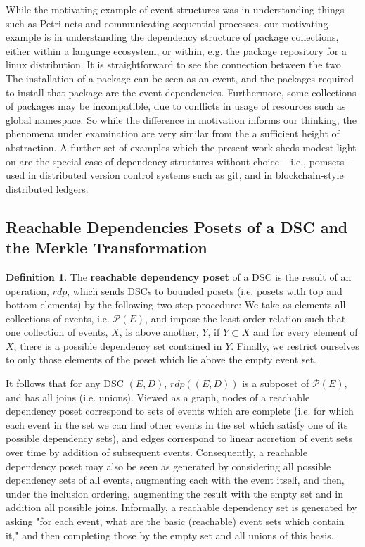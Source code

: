 \documentclass[hoptionsi,review,format=sigplan]{acmart}
\theoremstyle{definition}
\newtheorem{definition}{Definition}[section]
\newcommand{\Pc}{\mathcal{P}}
\begin{document}
While the motivating example of event structures was in understanding things such as Petri nets and communicating sequential processes, our motivating example is in understanding the dependency structure of package collections, either within a language ecosystem, or within, e.g. the package repository for a linux distribution. It is straightforward to see the connection between the two. The installation of a package can be seen as an event, and the packages required to install that package are the event dependencies. Furthermore, some collections of packages may be incompatible, due to conflicts in usage of resources such as global namespace. So while the difference in motivation informs our thinking, the phenomena under examination are very similar from the a sufficient height of abstraction. A further set of examples which the present work sheds modest light on are the special case of dependency structures without choice -- i.e., pomsets -- used in distributed version control systems such as git, and in blockchain-style distributed ledgers.

\subsection{Reachable Dependencies Posets of a DSC and the Merkle Transformation}

\begin{definition} The \textbf{reachable dependency poset} of a DSC is the result of an operation, \(rdp\), which sends DSCs to bounded posets (i.e. posets with top and bottom elements) by the following two-step procedure:  We take as elements all collections of events, i.e. \(\Pc(E)\), and impose the least order relation such that one collection of events, \(X\), is above another, \(Y\), if \(Y \subset X\) and for every element of \(X\), there is a possible dependency set contained in \(Y\).  Finally, we restrict ourselves to only those elements of the poset which lie above the empty event set.
\end{definition}

It follows that for any DSC \((E,D)\), \(rdp((E,D))\)  is a subposet of \(\Pc(E)\), and has all joins (i.e. unions). Viewed as a graph, nodes of a reachable dependency poset correspond to sets of events which are complete (i.e. for which each event in the set we can find other events in the set which satisfy one of its possible dependency sets), and edges correspond to linear accretion of event sets over time by addition of subsequent events. Consequently, a reachable dependency poset may also be seen as generated by considering all possible dependency sets of all events, augmenting each with the event itself, and then, under the inclusion ordering, augmenting the result with the empty set and in addition all possible joins. Informally, a reachable dependency set is generated by asking "for each event, what are the basic (reachable) event sets which contain it," and then completing those by the empty set and all unions of this basis.
\end{document}
